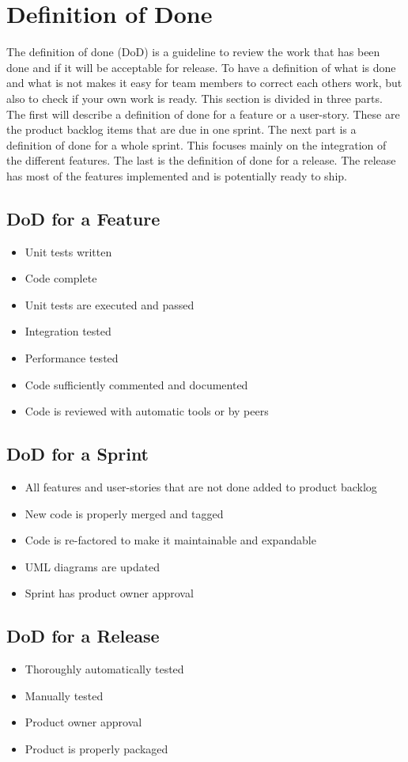\chapter{Definition of Done}

The definition of done (DoD) is a guideline to review the work that has been done and if it will be acceptable for release. To have a definition of what is done and what is not makes it easy for team members to correct each others work, but also to check if your own work is ready.
This section is divided in three parts. The first will describe a definition of done for a feature or a user-story. These are the product backlog items that are due in one sprint. The next part is a definition of done for a whole sprint. This focuses mainly on the integration of the different features. The last is the definition of done for a release. The release has most of the features implemented and is potentially ready to ship.

\section{DoD for a Feature}

\begin{itemize}
\item Unit tests written
\item Code complete
\item Unit tests are executed and passed
\item Integration tested
\item Performance tested
\item Code sufficiently commented and documented
\item Code is reviewed with automatic tools or by peers
\end{itemize}

\section{DoD for a Sprint}
\begin{itemize}
\item All features and user-stories that are not done added to product backlog
\item New code is properly merged and tagged
\item Code is re-factored to make it maintainable and expandable
\item UML diagrams are updated
\item Sprint has product owner approval
\end{itemize}

\section{DoD for a Release}
\begin{itemize}
\item Thoroughly automatically tested
\item Manually tested
\item Product owner approval
\item Product is properly packaged
\end{itemize}